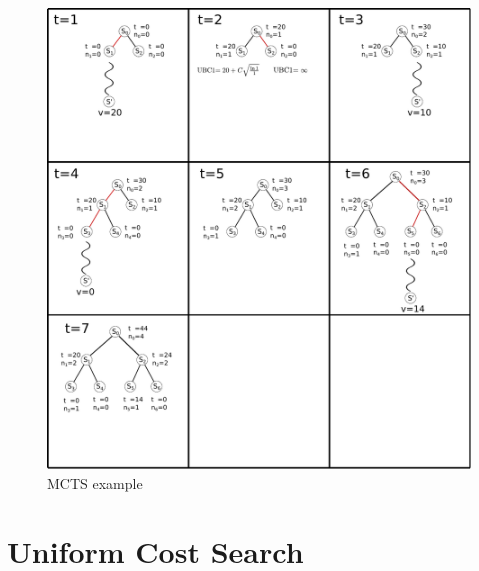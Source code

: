 \begin{figure}[h]
	\centering
	\includegraphics[scale=0.8]{./images/search_alg/mcts.pdf}
	\caption{MCTS example}
	\label{fig:mcts}
\end{figure}


\section{Uniform Cost Search}

